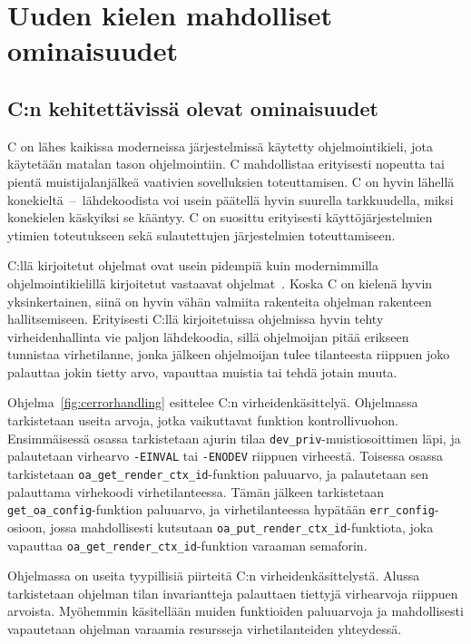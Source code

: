 \section{Uuden kielen mahdolliset ominaisuudet}

\subsection{C:n kehitettävissä olevat ominaisuudet}

C on lähes kaikissa moderneissa järjestelmissä käytetty ohjelmointikieli, jota
käytetään matalan tason ohjelmointiin. C mahdollistaa erityisesti nopeutta tai
pientä muistijalanjälkeä vaativien sovelluksien toteuttamisen. C on hyvin
lähellä konekieltä~--~lähdekoodista voi usein päätellä hyvin suurella
tarkkuudella, miksi konekielen käskyiksi se kääntyy. C on suosittu erityisesti
käyttöjärjestelmien ytimien toteutukseen sekä sulautettujen järjestelmien
toteuttamiseen.

C:llä kirjoitetut ohjelmat ovat usein pidempiä kuin modernimmilla
ohjelmointikielillä kirjoitetut vastaavat ohjelmat~\citep{codelength,
qsmcodelength}. Koska C on kielenä hyvin yksinkertainen, siinä on hyvin vähän
valmiita rakenteita ohjelman rakenteen hallitsemiseen. Erityisesti C:llä
kirjoitetuissa ohjelmissa hyvin tehty virheidenhallinta vie paljon lähdekoodia,
sillä ohjelmoijan pitää erikseen tunnistaa virhetilanne, jonka jälkeen
ohjelmoijan tulee tilanteesta riippuen joko palauttaa jokin tietty arvo,
vapauttaa muistia tai tehdä jotain muuta.

Ohjelma~\ref{fig:cerrorhandling} esittelee C:n virheidenkäsittelyä. Ohjelmassa
tarkistetaan useita arvoja, jotka vaikuttavat funktion kontrollivuohon.
Ensimmäisessä osassa tarkistetaan ajurin tilaa
\texttt{dev\_priv}-muistiosoittimen läpi, ja palautetaan virhearvo
\texttt{-EINVAL} tai \texttt{-ENODEV} riippuen virheestä. Toisessa osassa
tarkistetaan \texttt{oa\_get\_render\_ctx\_id}-funktion paluuarvo, ja
palautetaan sen palauttama virhekoodi virhetilanteessa. Tämän jälkeen
tarkistetaan \texttt{get\_oa\_config}-funktion paluuarvo, ja virhetilanteessa
hypätään \texttt{err\_config}-osioon, jossa mahdollisesti kutsutaan
\texttt{oa\_put\_render\_ctx\_id}-funk\-ti\-o\-ta, joka vapauttaa
\texttt{oa\_get\_render\_ctx\_id}-funktion varaaman semaforin.

Ohjelmassa on useita tyypillisiä piirteitä C:n virheidenkäsittelystä. Alussa
tarkistetaan ohjelman tilan invariantteja palauttaen tiettyjä virhearvoja
riippuen arvoista. Myöhemmin käsitellään muiden funktioiden paluuarvoja ja
mahdollisesti vapautetaan ohjelman varaamia resursseja virhetilanteiden
yhteydessä.

